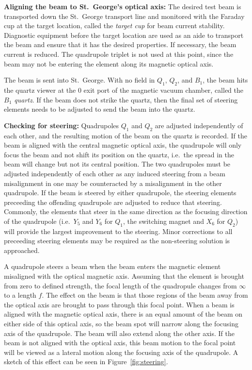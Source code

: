 \textbf{Aligning the beam to St.\ George's optical axis:}
The desired test beam is transported down the St.\ George transport line
and monitored with the Faraday cup at the target location, called the
\emph{target cup} for beam current stability. Diagnostic equipment
before the target location are used as an aide to transport the beam and
ensure that it has the desired properties. If necessary, the beam
current is reduced. The quadrupole triplet is not used at this point,
since the beam may not be entering the element along its magnetic
optical axis.

The beam is sent into St.\ George. With no field in $Q_1$, $Q_2$, and
$B_1$, the beam hits the quartz viewer at the 0\degree{} exit port of
the magnetic vacuum chamber, called the \emph{$B_1$ quartz}. If the beam
does not strike the quartz, then the final set of steering elements
needs to be adjusted to send the beam into the quartz.

\textbf{Checking for steering:}
Quadrupoles $Q_1$ and $Q_2$ are adjusted independently of each other,
and the resulting motion of the beam on the quartz is recorded. If the
beam is aligned with the central magnetic optical axis, the quadrupole
will only focus the beam and not shift its position on the quartz, i.e.\
the spread in the beam will change but not its central position. The two
quadrupoles must be adjusted independently of each other as any induced
steering from a beam misalignment in one may be counteracted by a
misalignment in the other quadrupole. If the beam is steered by either
quadrupole, the steering elements preceeding the offending quadrupole
are adjusted to reduce that steering. Commonly, the elements that steer
in the same direction as the focusing direction of the quadrupole (i.e.\
$Y_5$ and $Y_6$ for $Q_1$, the switching magnet and $X_6$ for $Q_2$)
will provide the largest improvement to the steering. Minor corrections
to all preceeding steering elements may be required as the non-steering
solution is approached.

A quadrupole steers a beam when the beam enters the magnetic element
misaligned with the optical magnetic axis. Assuming that the element is
brought from zero to defined strength, the focal length of the
quadropule changes from $\infty$ to a length $f$. The effect on the beam
is that those regions of the beam away from the optical axis are brought
to pass through this focal point. When a beam is aligned with the
magnetic optical axis, there is an equal amount of the beam on either
side of this optical axis, so the beam spot will narrow along the
focusing axis of the quadrupole. The beam will also extend along the
other axis. If the beam is not aligned with the optical axis, this beam
motion to the focal point will be viewed as a lateral motion along the
focusing axis of the quadrupole. A sketch of this effect can be seen in
Figure~\ref{fig:steering}.

